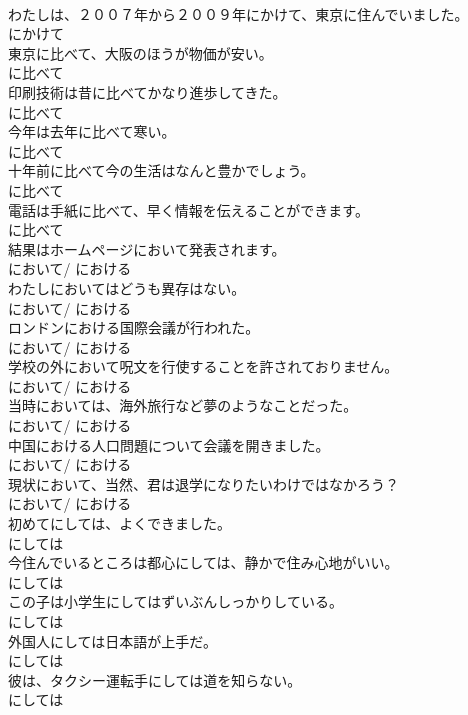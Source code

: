 \documentclass[8pt]{extreport}
\begin{document}
\begin{CJK}{UTF8}{min}
\\	わたしは、２００７年から２００９年にかけて、東京に住んでいました。	
\\	にかけて	
\\	東京に比べて、大阪のほうが物価が安い。	
\\	に比べて	
\\	印刷技術は昔に比べてかなり進歩してきた。	
\\	に比べて	
\\	今年は去年に比べて寒い。	
\\	に比べて	
\\	十年前に比べて今の生活はなんと豊かでしょう。	
\\	に比べて	
\\	電話は手紙に比べて、早く情報を伝えることができます。	
\\	に比べて	
\\	結果はホームページにおいて発表されます。	
\\	において/ における	
\\	わたしにおいてはどうも異存はない。	
\\	において/ における	
\\	ロンドンにおける国際会議が行われた。	
\\	において/ における	
\\	学校の外において呪文を行使することを許されておりません。	
\\	において/ における	
\\	当時においては、海外旅行など夢のようなことだった。	
\\	において/ における	
\\	中国における人口問題について会議を開きました。	
\\	において/ における	
\\	現状において、当然、君は退学になりたいわけではなかろう？	
\\	において/ における	
\\	初めてにしては、よくできました。	
\\	にしては	
\\	今住んでいるところは都心にしては、静かで住み心地がいい。	
\\	にしては	
\\	この子は小学生にしてはずいぶんしっかりしている。	
\\	にしては	
\\	外国人にしては日本語が上手だ。	
\\	にしては	
\\	彼は、タクシー運転手にしては道を知らない。	
\\	にしては	

\end{CJK}
\end{document}
